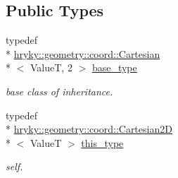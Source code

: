 \subsection*{Public Types}
\begin{DoxyCompactItemize}
\item 
\hypertarget{classhryky_1_1geometry_1_1coord_1_1_cartesian2_d_ab671f1b76873a8c508ef4b4e98d3bc78}{typedef \\*
\hyperlink{classhryky_1_1geometry_1_1coord_1_1_cartesian}{hryky\-::geometry\-::coord\-::\-Cartesian}\\*
$<$ Value\-T, 2 $>$ \hyperlink{classhryky_1_1geometry_1_1coord_1_1_cartesian2_d_ab671f1b76873a8c508ef4b4e98d3bc78}{base\-\_\-type}}\label{classhryky_1_1geometry_1_1coord_1_1_cartesian2_d_ab671f1b76873a8c508ef4b4e98d3bc78}

\begin{DoxyCompactList}\small\item\em base class of inheritance. \end{DoxyCompactList}\item 
\hypertarget{classhryky_1_1geometry_1_1coord_1_1_cartesian2_d_a7e2c46d2337c664213f252e08cb13cbe}{typedef \\*
\hyperlink{classhryky_1_1geometry_1_1coord_1_1_cartesian2_d}{hryky\-::geometry\-::coord\-::\-Cartesian2\-D}\\*
$<$ Value\-T $>$ \hyperlink{classhryky_1_1geometry_1_1coord_1_1_cartesian2_d_a7e2c46d2337c664213f252e08cb13cbe}{this\-\_\-type}}\label{classhryky_1_1geometry_1_1coord_1_1_cartesian2_d_a7e2c46d2337c664213f252e08cb13cbe}

\begin{DoxyCompactList}\small\item\em self. \end{DoxyCompactList}\end{DoxyCompactItemize}
